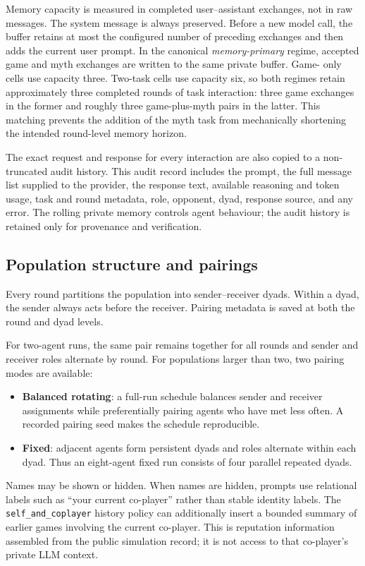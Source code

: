 Memory capacity is measured in completed user--assistant exchanges, not in raw
messages. The system message is always preserved. Before a new model call, the
buffer retains at most the configured number of preceding exchanges and then
adds the current user prompt. In the canonical \emph{memory-primary} regime,
accepted game and myth exchanges are written to the same private buffer. Game-
only cells use capacity three. Two-task cells use capacity six, so both regimes
retain approximately three completed rounds of task interaction: three game
exchanges in the former and roughly three game-plus-myth pairs in the latter.
This matching prevents the addition of the myth task from mechanically
shortening the intended round-level memory horizon.

The exact request and response for every interaction are also copied to a
non-truncated audit history. This audit record includes the prompt, the full
message list supplied to the provider, the response text, available reasoning
and token usage, task and round metadata, role, opponent, dyad, response source,
and any error. The rolling private memory controls agent behaviour; the audit
history is retained only for provenance and verification.

\subsection{Population structure and pairings}
\label{sec:protocol-pairings}

Every round partitions the population into sender--receiver dyads. Within a
dyad, the sender always acts before the receiver. Pairing metadata is saved at
both the round and dyad levels.

For two-agent runs, the same pair remains together for all rounds and sender
and receiver roles alternate by round. For populations larger than two, two
pairing modes are available:
\begin{itemize}
    \item \textbf{Balanced rotating}: a full-run schedule balances sender and
    receiver assignments while preferentially pairing agents who have met less
    often. A recorded pairing seed makes the schedule reproducible.
    \item \textbf{Fixed}: adjacent agents form persistent dyads and roles
    alternate within each dyad. Thus an eight-agent fixed run consists of four
    parallel repeated dyads.
\end{itemize}
Names may be shown or hidden. When names are hidden, prompts use relational
labels such as ``your current co-player'' rather than stable identity labels.
The \texttt{self\_and\_coplayer} history policy can additionally insert a
bounded summary of earlier games involving the current co-player. This is
reputation information assembled from the public simulation record; it is not
access to that co-player's private LLM context.

